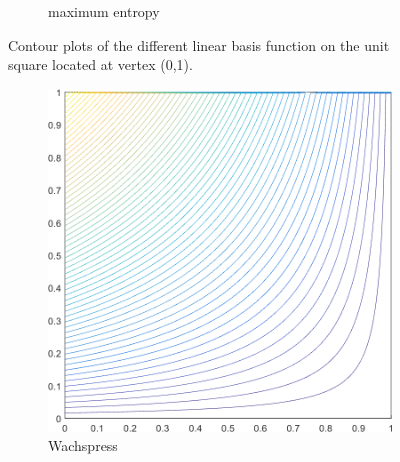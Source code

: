\begin{figure}
{\begin{subfigure}[b]{0.39\textwidth}
		\caption{maximum entropy}
	\end{subfigure}
}
\caption[Contour plots of the linear basis functions on the unit square.]{Contour plots of the different linear basis function on the unit square located at vertex (0,1).}
\end{figure}

\begin{figure}
\label{fig::2D_Summary_deg_square_basis_functions}
\centering
{
	\begin{subfigure}[b]{0.39\textwidth}
		\centering
		\includegraphics[width=\textwidth]{figures/sec_BF/deg_square_WACHSPRESS1_contour_b5.png}
		\caption{Wachspress}
	\end{subfigure}
	\hspace{1.5cm}
	\begin{subfigure}[b]{0.39\textwidth}
		\centering

\end{subfigure}}
\end{figure}
